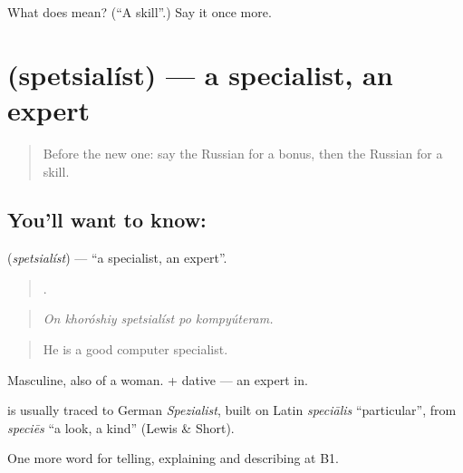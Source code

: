 \begin{tcolorbox}[breakable,colback=teal!4,colframe=teal!35!black,title={Before you move on}]
What does  mean? (\textquotedblleft{}A skill\textquotedblright{}.) Say it once more.
\end{tcolorbox}
\section[\texorpdfstring{\ru{специалист} (spetsialíst)}{специалист (spetsialíst)}]{ (spetsialíst) — a specialist, an expert}

\label{lesson:RU-C362-specialist}



\begin{quote}
Before the new one: say the Russian for a bonus, then the Russian for a skill.
\end{quote}

\subsection*{You'll want to know: }
\textbf{} (\emph{spetsialíst}) — \textquotedblleft{}a specialist, an expert\textquotedblright{}.

\begin{quote}
    .
\end{quote}

\begin{quote}
\emph{On khoróshiy spetsialíst po kompyúteram.}
\end{quote}

\begin{quote}
He is a good computer specialist.
\end{quote}

Masculine, also of a woman. \emph{ } + dative — an expert in.

\begin{cousinweb}
\textbf{} is usually traced to German \emph{Spezialist}, built on Latin \emph{speciālis} \textquotedblleft{}particular\textquotedblright{}, from \emph{speciēs} \textquotedblleft{}a look, a kind\textquotedblright{} (Lewis \& Short).
\end{cousinweb}

\begin{grammarlens}[title={What you've built}]
One more word for telling, explaining and describing at B1.
\end{grammarlens}


